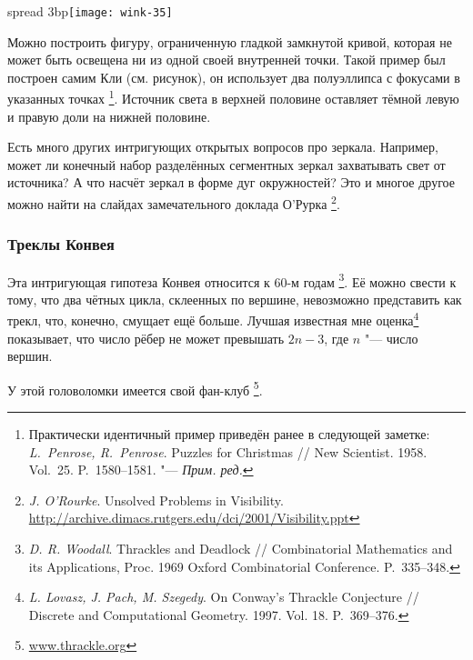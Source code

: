 \documentclass[twoside]{book}
\begin{document}
\hbox spread 3bp{\hss\texttt{[image: wink-35]}}
\begin{figure}
\vspace{-5\jot}
\end{figure}


Можно построить фигуру, ограниченную гладкой замкнутой кривой, которая
не может быть освещена ни из одной своей внутренней точки.
Такой
пример был построен самим Кли (см. рисунок), он использует два
полуэллипса с фокусами в указанных точках%
\footnote{Практически идентичный пример приведён ранее в следующей заметке: \emph{L.~Penrose, R.~Penrose}. Puzzles for Christmas /\!/ {New Scientist}. 1958. Vol.~25. P.~1580--1581. "--- \emph{Прим. ред.}}.
Источник света в верхней половине оставляет тёмной левую и правую доли на нижней половине.



Есть много других интригующих открытых вопросов про зеркала.
Например, может ли конечный набор разделённых сегментных зеркал
захватывать свет от источника?  А что насчёт зеркал в форме дуг
окружностей?  Это и многое другое можно найти на слайдах
замечательного доклада О’Рурка%
\footnote{\emph{J. O'Rourke}. Unsolved Problems in Visibility. \url{http://archive.dimacs.rutgers.edu/dci/2001/Visibility.ppt}}.

\subsubsection*{Треклы Конвея}

Эта интригующая гипотеза Конвея относится к 60-м годам%
\footnote{\emph{D. R. Woodall}. Thrackles and Deadlock /\!/ {Combinatorial Mathematics and its Appli\-ca\-tions}, Proc. 1969 Oxford Combinatorial Conference. P.~335--348.}.
Её можно свести к тому, что два чётных цикла, склеенных по вершине, невозможно представить как трекл,
что, конечно, смущает ещё больше.
Лучшая известная мне оценка\footnote{\emph{L. Lovasz, J. Pach, M. Szegedy}. On Conway's Thrackle Conjecture /\!/ {Discrete and Compu\-ta\-tional Geometry}. 1997. Vol. 18. P.~369--376.} показывает, что число рёбер не может превышать $2n-3$, где $n$ "--- число вершин.

У этой головоломки имеется свой фан-клуб%
\footnote{\href{http://www.thrackle.org}{\url{www.thrackle.org}}}.
\end{document}
